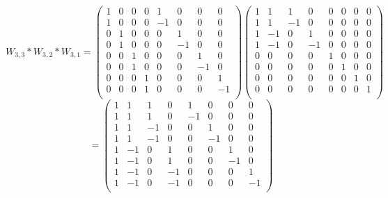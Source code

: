 \documentclass[12pt]{article}
\begin{document}
\\
\\
\[
W_{3, 3}*W_{3, 2}*W_{3, 1} = 
\begin{pmatrix}
1  &  0  &  0 & 0 & 1   &  0   & 0    & 0  \\
1  &  0  &  0 & 0 & -1 &  0   & 0    & 0  \\
0   &  1  &  0 & 0 &  0  & 1   & 0    & 0  \\
0   &  1  &  0 & 0 &  0  & -1 & 0    & 0  \\
0   &  0  &  1 & 0 &  0  &  0  & 1    & 0  \\
0   &  0  &  1 & 0 &  0  &  0  & -1  & 0  \\
0   &  0  &  0 & 1 &  0  &  0  & 0    & 1  \\
0   &  0  &  0 & 1 &  0  &  0  & 0    & -1  \\
\end{pmatrix}
\begin{pmatrix}
1 & 1 & 1 & 0 & 0 & 0 & 0 & 0 \\   
1 & 1 & -1 & 0 & 0 & 0 & 0 & 0 \\
1 & -1 & 0 & 1 & 0 &  0 &  0 &  0 \\
1 & -1 & 0 & -1 & 0 & 0 & 0 &  0 \\
0 & 0 & 0 & 0 & 1 & 0 & 0 & 0 \\
0 & 0 & 0 & 0 & 0 & 1 & 0 & 0 \\
0 & 0 & 0 & 0 & 0 & 0 & 1 & 0 \\
0 & 0 & 0 & 0 & 0 & 0 & 0 & 1 \\
\end{pmatrix}
\]
\[
= 
\begin{pmatrix}
1 & 1 & 1 & 0 & 1 & 0 & 0 & 0 \\   
1 & 1 & 1 & 0 & -1 & 0 & 0 & 0 \\
1 & 1 & -1 & 0 & 0 &  1 &  0 &  0 \\
1 & 1 & -1 & 0 & 0 & -1 & 0 &  0 \\
1 & -1 & 0 & 1 & 0 & 0 & 1 & 0 \\
1 & -1 & 0 & 1 & 0 & 0 & -1 & 0 \\
1 & -1 & 0 & -1 & 0 & 0 & 0 & 1 \\
1 & -1 & 0 & -1 & 0 & 0 & 0 & -1 \\
\end{pmatrix}
\]
\end{document}

